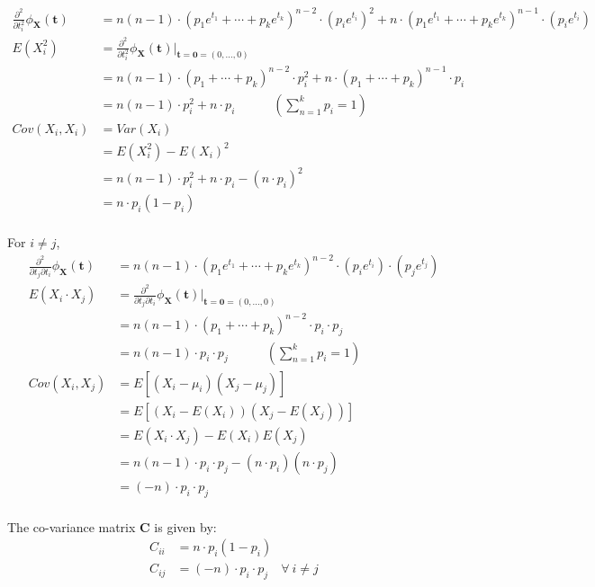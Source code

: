 \documentclass[11pt, fleqn]{article}
\begin{document}
\begin{equation*}
    \begin{split}
        \frac{\partial^2}{\partial t_i^2} \phi_{\mathbf{X}}(\mathbf{t}) &= n(n-1) \cdot (p_1 e^{t_1} + \cdots + p_k e^{t_k})^{n-2} \cdot (p_i e^{t_i})^2 + n \cdot (p_1 e^{t_1} + \cdots + p_k e^{t_k})^{n-1} \cdot (p_i e^{t_i}) \\
        E(X_i^2) &= \frac{\partial^2}{\partial t_i^2} \phi_{\mathbf{X}}(\mathbf{t}) \bigg\rvert_{\mathbf{t} = \mathbf{0} = (0, \dots, 0)} \\
            &= n(n-1) \cdot (p_1 + \cdots + p_k)^{n-2} \cdot p_i^2 + n \cdot (p_1 + \cdots + p_k)^{n-1} \cdot p_i \\
            &= n(n-1) \cdot p_i^2 + n \cdot p_i \hspace{3em} (\sum_{n=1}^{k} p_i = 1) \\
        Cov(X_i, X_i) &= Var(X_i) \\
            &= E(X_i^2) - E(X_i)^2 \\
            &= n(n-1) \cdot p_i^2 + n \cdot p_i - (n \cdot p_i)^2 \\
            &= n \cdot p_i (1 - p_i) \\
    \end{split}
\end{equation*}

For $i \ne j$,
\begin{equation*}
    \begin{split}
        \frac{\partial^2}{\partial t_j \partial t_i} \phi_{\mathbf{X}}(\mathbf{t}) &= n(n-1) \cdot (p_1 e^{t_1} + \cdots + p_k e^{t_k})^{n-2} \cdot (p_i e^{t_i}) \cdot (p_j e^{t_j}) \\
        E(X_i \cdot X_j) &= \frac{\partial^2}{\partial t_j \partial t_i} \phi_{\mathbf{X}}(\mathbf{t}) \bigg\rvert_{\mathbf{t} = \mathbf{0} = (0, \dots, 0)} \\
            &= n(n-1) \cdot (p_1 + \cdots + p_k)^{n-2} \cdot p_i \cdot p_j \\
            &= n(n-1) \cdot p_i  \cdot p_j \hspace{3em} (\sum_{n=1}^{k} p_i = 1) \\
        Cov(X_i, X_j) &= E[(X_i - \mu_i)(X_j - \mu_j)] \\
            &= E[(X_i - E(X_i))(X_j - E(X_j))] \\
            &= E(X_i \cdot X_j) - E(X_i)E(X_j) \\
            &= n(n-1) \cdot p_i  \cdot p_j - (n \cdot p_i)(n \cdot p_j) \\
            &= (-n) \cdot p_i \cdot p_j  \\
    \end{split}
\end{equation*}

The co-variance matrix $\mathbf{C}$ is given by:
\begin{equation*}
    \begin{split}
        C_{ii} &= n \cdot p_i (1 - p_i) \\
        C_{ij} &= (-n) \cdot p_i \cdot p_j \quad \forall \ i \ne j \\
    \end{split}
\end{equation*}
\end{document}
